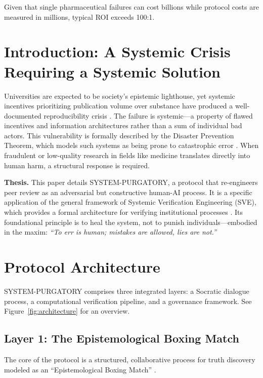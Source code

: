 \documentclass[11pt,a4paper]{article}
\begin{document}
\begin{small}
\noindent Given that single pharmaceutical failures can cost billions while protocol costs are measured in millions, typical ROI exceeds 100:1.

\vspace{0.5cm}
\clearpage
\setcounter{page}{1}

\section{Introduction: A Systemic Crisis Requiring a Systemic Solution}
Universities are expected to be society's epistemic lighthouse, yet systemic incentives prioritizing publication volume over substance have produced a well-documented reproducibility crisis \citep{Ioannidis2005}. The failure is systemic—a property of flawed incentives and information architectures rather than a sum of individual bad actors. This vulnerability is formally described by the Disaster Prevention Theorem, which models such systems as being prone to catastrophic error \citep{Kovnatsky2025SVE1}. When fraudulent or low-quality research in fields like medicine translates directly into human harm, a structural response is required.

\textbf{Thesis.} This paper details SYSTEM-PURGATORY, a protocol that re-engineers peer review as an adversarial but constructive human-AI process. It is a specific application of the general framework of Systemic Verification Engineering (SVE), which provides a formal architecture for verifying institutional processes \citep{Kovnatsky2025SVE2}. Its foundational principle is to heal the system, not to punish individuals—embodied in the maxim: \textit{``To err is human; mistakes are allowed, lies are not.''}

\section{Protocol Architecture}
SYSTEM-PURGATORY comprises three integrated layers: a Socratic dialogue process, a computational verification pipeline, and a governance framework. See Figure~\ref{fig:architecture} for an overview.

\subsection{Layer 1: The Epistemological Boxing Match}
The core of the protocol is a structured, collaborative process for truth discovery modeled as an ``Epistemological Boxing Match'' \citep{Kovnatsky2025Boxing}.


\end{small}
\end{document}
